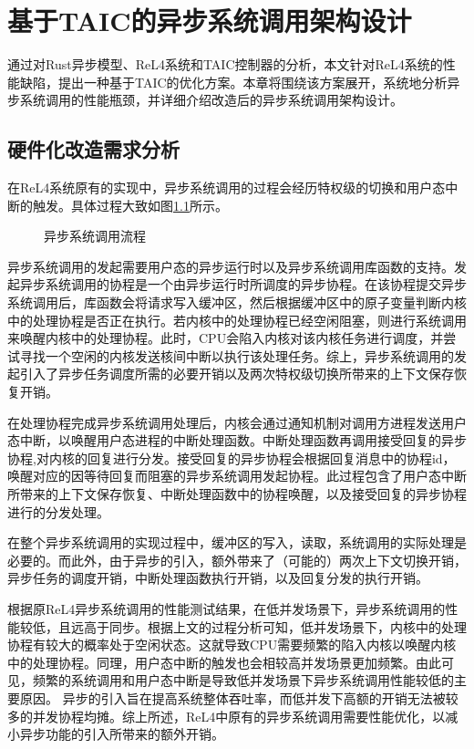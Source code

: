 \chapter{基于TAIC的异步系统调用架构设计}

通过对Rust异步模型、ReL4系统和TAIC控制器的分析，本文针对ReL4系统的性能缺陷，提出一种基于TAIC的优化方案。本章将围绕该方案展开，系统地分析异步系统调用的性能瓶颈，并详细介绍改造后的异步系统调用架构设计。

\section{硬件化改造需求分析}\label{sec:syscallanalysis}

在ReL4系统原有的实现中，异步系统调用的过程会经历特权级的切换和用户态中断的触发。具体过程大致如图\ref{asyncsyscall}所示\cite{rel4_kernel}。

\begin{figure}[htbp]
    \centering
    
    \caption{异步系统调用流程}\label{asyncsyscall}
\end{figure}

异步系统调用的发起需要用户态的异步运行时以及异步系统调用库函数的支持。发起异步系统调用的协程是一个由异步运行时所调度的异步协程。在该协程提交异步系统调用后，库函数会将请求写入缓冲区，然后根据缓冲区中的原子变量判断内核中的处理协程是否正在执行。若内核中的处理协程已经空闲阻塞，则进行系统调用来唤醒内核中的处理协程。此时，CPU会陷入内核对该内核任务进行调度，并尝试寻找一个空闲的内核发送核间中断以执行该处理任务。综上，异步系统调用的发起引入了异步任务调度所需的必要开销以及两次特权级切换所带来的上下文保存恢复开销。

在处理协程完成异步系统调用处理后，内核会通过通知机制对调用方进程发送用户态中断，以唤醒用户态进程的中断处理函数。中断处理函数再调用接受回复的异步协程,对内核的回复进行分发。接受回复的异步协程会根据回复消息中的协程id，唤醒对应的因等待回复而阻塞的异步系统调用发起协程。此过程包含了用户态中断所带来的上下文保存恢复、中断处理函数中的协程唤醒，以及接受回复的异步协程进行的分发处理。

在整个异步系统调用的实现过程中，缓冲区的写入，读取，系统调用的实际处理是必要的。而此外，由于异步的引入，额外带来了（可能的）两次上下文切换开销，异步任务的调度开销，中断处理函数执行开销，以及回复分发的执行开销。

根据原ReL4异步系统调用的性能测试结果，在低并发场景下，异步系统调用的性能较低，且远高于同步。根据上文的过程分析可知，低并发场景下，内核中的处理协程有较大的概率处于空闲状态。这就导致CPU需要频繁的陷入内核以唤醒内核中的处理协程。同理，用户态中断的触发也会相较高并发场景更加频繁。由此可见，频繁的系统调用和用户态中断是导致低并发场景下异步系统调用性能较低的主要原因。
异步的引入旨在提高系统整体吞吐率，而低并发下高额的开销无法被较多的并发协程均摊。综上所述，ReL4中原有的异步系统调用需要性能优化，以减小异步功能的引入所带来的额外开销。


